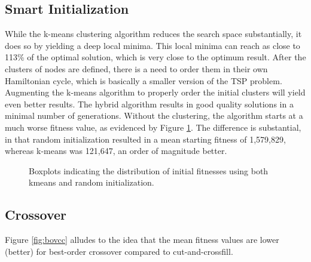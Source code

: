 \documentclass[12pt,twocolumn,oneside]{osajnl}
\begin{document}
\subsection{Smart Initialization}
While the k-means clustering algorithm reduces the search space substantially, it does so by yielding a deep local minima. This local minima can reach as close to 113\% of the optimal solution, which is very close to the optimum result. After the clusters of nodes are defined, there is a need to order them in their own Hamiltonian cycle, which is basically a smaller version of the TSP problem. Augmenting the k-means algorithm to properly order the initial clusters will yield even better results. The hybrid algorithm results in good quality solutions in a minimal number of generations. Without the clustering, the algorithm starts at a much worse fitness value, as evidenced by Figure \ref{fig:kmeans}. The difference is substantial, in that random initialization resulted in a mean starting fitness of 1,579,829, whereas k-means was 121,647, an order of magnitude better.

\begin{figure}[htbp]
\centering
{}
\caption{Boxplots indicating the distribution of initial fitnesses using both kmeans and random initialization.}
\label{fig:kmeans}
\end{figure}

\subsection{Crossover}
Figure \ref{fig:bovcc} alludes to the idea that the mean fitness values are lower (better) for best-order crossover compared to cut-and-crossfill. 
\end{document}
